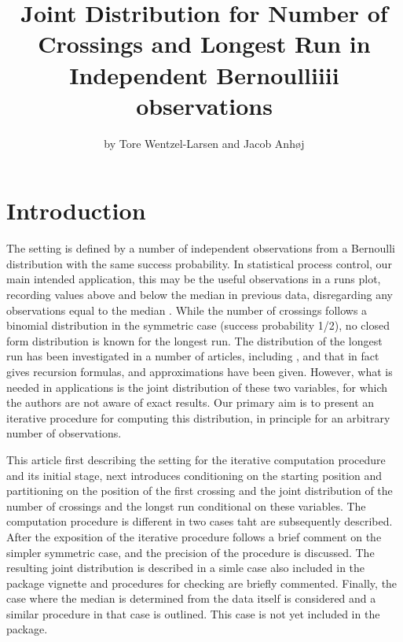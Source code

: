 \title{Joint Distribution for Number of Crossings and Longest Run in Independent Bernoulliiii observations}
\author{by Tore Wentzel-Larsen and Jacob Anh{\o}j}

\maketitle


\section{Introduction}

The setting is defined by a number of independent observations from a Bernoulli distribution with the same success probability. In statistical process control, our main intended application, this may be the useful observations in a runs plot, recording values above and below the median in previous data, disregarding any observations equal to the median \citep{Anhoej:2015}. While the number of crossings follows a binomial distribution in the symmetric case (success probability 1/2), no closed form distribution is known for the longest run. The distribution of the longest run has been investigated in a number of articles, including \citet{Schilling:2012}, and \citet{Fazekas:2010} that in fact gives recursion formulas, and approximations have been given. However, what is needed in applications is the joint distribution of these two variables, for which the authors are not aware of exact results. Our primary aim is to present an iterative procedure for computing this distribution, in principle for an arbitrary number of observations.

This article first describing the setting for the iterative computation procedure and its initial stage, next introduces conditioning on the starting position and partitioning on the position of the first crossing and the joint distribution of the number of crossings and the longst run conditional on these variables. The computation procedure is different in two cases taht are subsequently described. After the exposition of the iterative procedure follows a brief comment on the simpler symmetric case, and the precision of the procedure is discussed. The resulting joint distribution is described in a simle case also included in the package vignette and procedures for checking are briefly commented. Finally, the case where the median is determined from the data itself is considered and a similar procedure in that case is outlined. This case is not yet included in the package.

